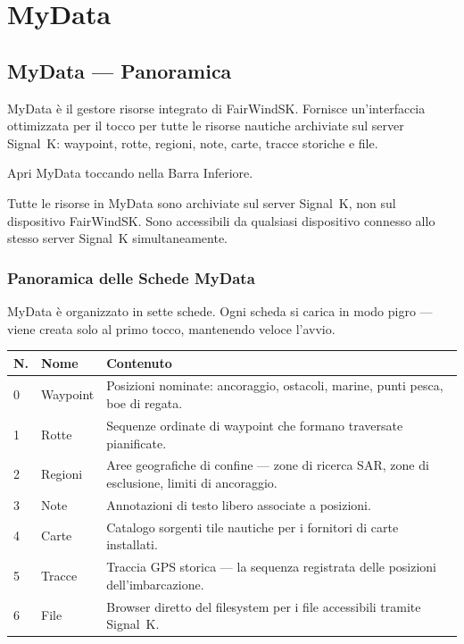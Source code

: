 \part{MyData}

\chapter{MyData --- Panoramica}
\label{ch:mydata}

MyData è il gestore risorse integrato di FairWindSK.
Fornisce un'interfaccia ottimizzata per il tocco per tutte le risorse nautiche archiviate
sul server Signal~K: waypoint, rotte, regioni, note, carte, tracce storiche e file.

Apri MyData toccando  nella Barra Inferiore.


\begin{notebox}
Tutte le risorse in MyData sono archiviate sul server Signal~K, non sul dispositivo
FairWindSK. Sono accessibili da qualsiasi dispositivo connesso allo stesso server
Signal~K simultaneamente.
\end{notebox}

\section{Panoramica delle Schede MyData}

MyData è organizzato in sette schede. Ogni scheda si carica in modo pigro --- viene
creata solo al primo tocco, mantenendo veloce l'avvio.

\begin{longtable}{C{0.7cm}L{2.8cm}L{10.2cm}}
\toprule
{}
\color{white}\sffamily\bfseries N. &
\color{white}\sffamily\bfseries Nome &
\color{white}\sffamily\bfseries Contenuto \\
 & Waypoint & Posizioni nominate: ancoraggio, ostacoli, marine, punti pesca, boe di regata. \\
1 & Rotte    & Sequenze ordinate di waypoint che formano traversate pianificate. \\
2 & Regioni  & Aree geografiche di confine --- zone di ricerca SAR, zone di esclusione, limiti di ancoraggio. \\
3 & Note     & Annotazioni di testo libero associate a posizioni. \\
4 & Carte    & Catalogo sorgenti tile nautiche per i fornitori di carte installati. \\
5 & Tracce   & Traccia GPS storica --- la sequenza registrata delle posizioni dell'imbarcazione. \\
6 & File     & Browser diretto del filesystem per i file accessibili tramite Signal~K. \\
\bottomrule
\end{longtable}

